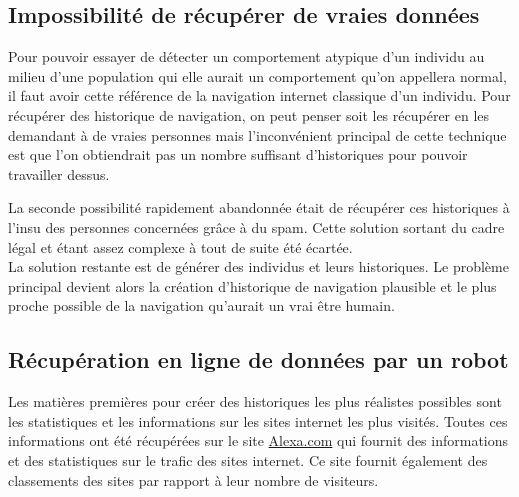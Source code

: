 \documentclass[a4paper, 11pt]{article}
\begin{document}
\subsection{Impossibilité de récupérer de vraies données}
Pour pouvoir essayer de détecter un comportement atypique d'un individu au milieu d'une population qui elle aurait un comportement qu'on appellera normal, il faut avoir cette référence de la navigation internet classique d'un individu. Pour récupérer des historique de navigation, on peut penser soit les récupérer en les demandant à de vraies personnes mais l'inconvénient principal de cette technique est que l'on obtiendrait pas un nombre suffisant d'historiques pour pouvoir travailler dessus. 

La seconde possibilité rapidement abandonnée était de récupérer ces historiques à l'insu des personnes concernées grâce à du spam. Cette solution sortant du cadre légal et étant assez complexe à tout de suite été écartée.\\

La solution restante est de générer des individus et leurs historiques. Le problème principal devient alors la création d'historique de navigation plausible et le plus proche possible de la navigation qu'aurait un vrai être humain.

\subsection{Récupération en ligne de données par un robot}

Les matières premières pour créer des historiques les plus réalistes possibles sont les statistiques et les informations sur les sites internet les plus visités. Toutes ces informations ont été récupérées sur le site \href{http://www.alexa.com/siteinfo}{Alexa.com} qui fournit des informations et des statistiques sur le trafic des sites internet. Ce site fournit également des classements des sites par rapport à leur nombre de visiteurs.
\end{document}
